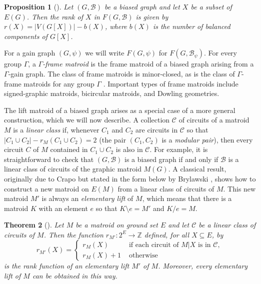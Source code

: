 \documentclass[12pt]{article}
\newtheorem{theorem}{Theorem}[section]
\newtheorem{proposition}[theorem]{Proposition}
\theoremstyle{definition}
\newcommand{\cB}{\mathcal{B}}
\newcommand{\cC}{\mathcal{C}}
\newcommand{\del}{\!\setminus\!}
\begin{document}
\begin{proposition}[{\cite{Zaslavsky1991}}]\label{prop: rank of X in frame matroid}
Let $(G, \cB)$ be a biased graph and let $X$ be a subset of $E(G)$. Then the rank of $X$ in $F(G, \cB)$ is given by $r(X)=|V(G[X])| - b(X)$, where $b(X)$ is the number of balanced components of $G[X]$.
\end{proposition}




For a gain graph $(G, \psi)$ we will write $F(G, \psi)$ for $F(G, \cB_{\psi})$.
For every group $\Gamma$, a \emph{$\Gamma$-frame matroid} is the frame matroid of a biased graph arising from a $\Gamma$-gain graph.
The class of frame matroids is minor-closed, as is the class of $\Gamma$-frame matroids for any group $\Gamma$ \cite{Zaslavsky1991}.
Important types of frame matroids include signed-graphic matroids, bicircular matroids, and Dowling geometries.


The lift matroid of a biased graph arises as a special case of a more general construction, which we will now describe.
A collection $\cC$ of circuits of a matroid $M$ is a \emph{linear class} if, whenever $C_1$ and $C_2$ are circuits in $\cC$ so that $|C_1 \cup C_2| - r_M(C_1 \cup C_2) = 2$ (the pair $(C_1, C_2)$ is a \emph{modular pair}), then every circuit $C$ of $M$ contained in $C_1 \cup C_2$ is also in $\cC$.
For example, it is straightforward to check that $(G, \cB)$ is a biased graph if and only if $\cB$ is a linear class of circuits of the graphic matroid $M(G)$.
A classical result, originally due to Crapo \cite{Crapo1965} but stated in the form below by Brylawski \cite{Brylawski1986}, shows how to construct a new matroid on $E(M)$ from a linear class of circuits of $M$.
This new matroid $M'$ is always an \emph{elementary lift} of $M$, which means that there is a matroid $K$ with an element $e$ so that $K \del e = M'$ and $K /e = M$.


\begin{theorem}[{\cite{Brylawski1986, Crapo1965}}]\label{thm: brylawski}
Let $M$ be a matroid on ground set $E$ and let $\cC$ be a linear class of circuits of $M$. 
Then the function $r_{M'} \colon 2^E \to \mathbb Z$ defined, for all $X \subseteq E$, by 
$$r_{M'}(X)=\begin{cases}
r_M(X) & \text{ if each circuit of $M|X$ is in $\cC$},  \\
r_M(X)+1 & \text{ otherwise} 
\end{cases}$$
is the rank function of an elementary lift $M'$ of $M$.
Moreover, every elementary lift of $M$ can be obtained in this way.
\end{theorem}
\end{document}
